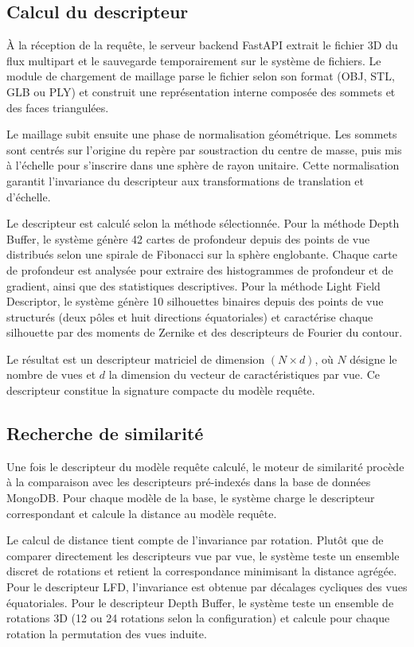 \documentclass[11pt,a4paper,oneside]{report}
\begin{document}
\subsection{Calcul du descripteur}

À la réception de la requête, le serveur backend FastAPI extrait le fichier 3D du flux multipart et le sauvegarde temporairement sur le système de fichiers. Le module de chargement de maillage parse le fichier selon son format (OBJ, STL, GLB ou PLY) et construit une représentation interne composée des sommets et des faces triangulées.

Le maillage subit ensuite une phase de normalisation géométrique. Les sommets sont centrés sur l'origine du repère par soustraction du centre de masse, puis mis à l'échelle pour s'inscrire dans une sphère de rayon unitaire. Cette normalisation garantit l'invariance du descripteur aux transformations de translation et d'échelle.

Le descripteur est calculé selon la méthode sélectionnée. Pour la méthode Depth Buffer, le système génère 42 cartes de profondeur depuis des points de vue distribués selon une spirale de Fibonacci sur la sphère englobante. Chaque carte de profondeur est analysée pour extraire des histogrammes de profondeur et de gradient, ainsi que des statistiques descriptives. Pour la méthode Light Field Descriptor, le système génère 10 silhouettes binaires depuis des points de vue structurés (deux pôles et huit directions équatoriales) et caractérise chaque silhouette par des moments de Zernike et des descripteurs de Fourier du contour.

Le résultat est un descripteur matriciel de dimension $(N \times d)$, où $N$ désigne le nombre de vues et $d$ la dimension du vecteur de caractéristiques par vue. Ce descripteur constitue la signature compacte du modèle requête.

\subsection{Recherche de similarité}

Une fois le descripteur du modèle requête calculé, le moteur de similarité procède à la comparaison avec les descripteurs pré-indexés dans la base de données MongoDB. Pour chaque modèle de la base, le système charge le descripteur correspondant et calcule la distance au modèle requête.

Le calcul de distance tient compte de l'invariance par rotation. Plutôt que de comparer directement les descripteurs vue par vue, le système teste un ensemble discret de rotations et retient la correspondance minimisant la distance agrégée. Pour le descripteur LFD, l'invariance est obtenue par décalages cycliques des vues équatoriales. Pour le descripteur Depth Buffer, le système teste un ensemble de rotations 3D (12 ou 24 rotations selon la configuration) et calcule pour chaque rotation la permutation des vues induite.
\end{document}
